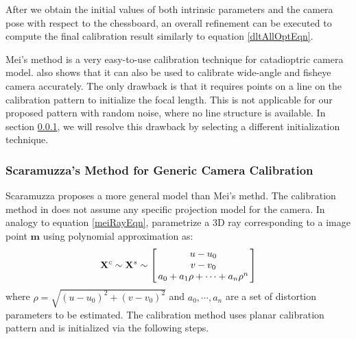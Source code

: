 \documentclass{report}
\begin{document}
After we obtain the initial values of both intrinsic parameters and the camera pose with respect to the chessboard, an overall refinement can be executed to compute the final calibration result similarly to equation \ref{dltAllOptEqn}. 

Mei's method is a very easy-to-use calibration technique for catadioptric camera model. \cite{mei2007single} also shows that it can also be used to calibrate wide-angle and fisheye camera accurately. The only drawback is that it requires points on a line on the calibration pattern to initialize the focal length. This is not applicable for our proposed pattern with random noise, where no line structure is available. In section \ref{}, we will resolve this drawback by selecting a different initialization technique. 

\subsubsection{Scaramuzza's Method for Generic Camera Calibration}
Scaramuzza \cite{scaramuzza2006toolbox} proposes a more general model than Mei's methd. The calibration method in \cite{scaramuzza2006toolbox} does not assume any specific projection model for the camera. In analogy to equation \ref{meiRayEqn}, \cite{scaramuzza2006toolbox} parametrize a 3D ray corresponding to a image point $\mathbf{m}$ using polynomial approximation as: 
\begin{equation}
\mathbf{X}^c \sim \mathbf{X}^s \sim
\arraycolsep=1.5pt%
\begin{bmatrix}
	\begin{array}{c}
	u - u_0 \\ v - v_0 \\ a_0 + a_1 \rho + \cdots + a_n \rho^n
	\end{array}
\end{bmatrix} 
\label{scaraRayEqn}
\end{equation}
where $\rho = \sqrt{(u - u_0)^2 + (v - v_0)^2}$ and $a_0, \cdots, a_n$ are a set of distortion parameters to be estimated. The calibration method uses planar calibration pattern and is initialized via the following steps. 
\end{document}
